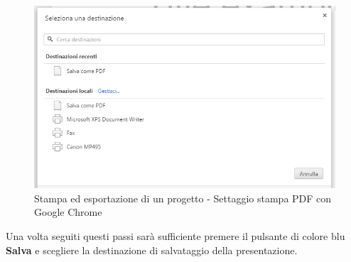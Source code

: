 \begin{figure}[H] 
	\centering 
	\includegraphics[scale=0.40] {img/salvacome.png}
	\caption{Stampa ed esportazione di un progetto - Settaggio stampa PDF con Google Chrome} 
\end{figure}

\noindent Una volta seguiti questi passi sarà sufficiente premere il pulsante di colore blu \textbf{Salva} e scegliere la destinazione di salvataggio della presentazione. 
